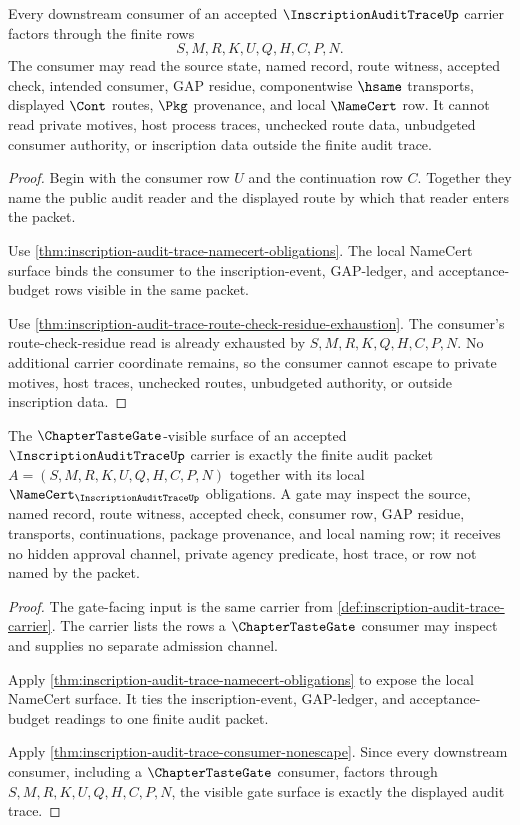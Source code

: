 \begin{theorem}
\label{thm:inscription-audit-trace-consumer-nonescape}
Every downstream consumer of an accepted $\InscriptionAuditTraceUp$ carrier factors through the finite rows
$$
S,M,R,K,U,Q,H,C,P,N.
$$
The consumer may read the source state, named record, route witness, accepted check, intended consumer, GAP residue, componentwise $\hsame$ transports, displayed $\Cont$ routes, $\Pkg$ provenance, and local $\NameCert$ row. It cannot read private motives, host process traces, unchecked route data, unbudgeted consumer authority, or inscription data outside the finite audit trace.
\end{theorem}
\begin{proof}
Begin with the consumer row $U$ and the continuation row $C$. Together they name the public audit reader and the displayed route by which that reader enters the packet.

Use \autoref{thm:inscription-audit-trace-namecert-obligations}. The local NameCert surface binds the consumer to the inscription-event, GAP-ledger, and acceptance-budget rows visible in the same packet.

Use \autoref{thm:inscription-audit-trace-route-check-residue-exhaustion}. The consumer's route-check-residue read is already exhausted by $S,M,R,K,Q,H,C,P,N$. No additional carrier coordinate remains, so the consumer cannot escape to private motives, host traces, unchecked routes, unbudgeted authority, or outside inscription data.
\end{proof}

\begin{theorem}
\label{thm:inscription-audit-trace-tastegate-visible-surface}
The $\ChapterTasteGate$-visible surface of an accepted $\InscriptionAuditTraceUp$ carrier is exactly the finite audit packet $A=(S,M,R,K,U,Q,H,C,P,N)$ together with its local $\NameCert_{\InscriptionAuditTraceUp}$ obligations. A gate may inspect the source, named record, route witness, accepted check, consumer row, GAP residue, transports, continuations, package provenance, and local naming row; it receives no hidden approval channel, private agency predicate, host trace, or row not named by the packet.
\end{theorem}
\begin{proof}
The gate-facing input is the same carrier from \autoref{def:inscription-audit-trace-carrier}. The carrier lists the rows a $\ChapterTasteGate$ consumer may inspect and supplies no separate admission channel.

Apply \autoref{thm:inscription-audit-trace-namecert-obligations} to expose the local NameCert surface. It ties the inscription-event, GAP-ledger, and acceptance-budget readings to one finite audit packet.

Apply \autoref{thm:inscription-audit-trace-consumer-nonescape}. Since every downstream consumer, including a $\ChapterTasteGate$ consumer, factors through $S,M,R,K,U,Q,H,C,P,N$, the visible gate surface is exactly the displayed audit trace.
\end{proof}


